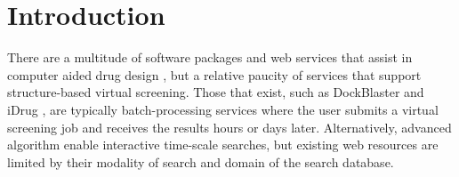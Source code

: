 \section{Introduction}

There are a multitude of software packages and web services that assist in computer aided drug design \cite{Villoutreix_2013}, but a relative paucity of services that support structure-based virtual screening.  Those that exist, such as DockBlaster \cite{Irwin_2009} and iDrug \cite{Wang_2014}, are typically batch-processing services where the user submits a virtual screening job and receives the results hours or days later.  Alternatively, advanced algorithm enable interactive time-scale searches, but existing web resources \cite{Koes_2012,Koes_2012z}
are limited by their modality of search and domain of the search database.

